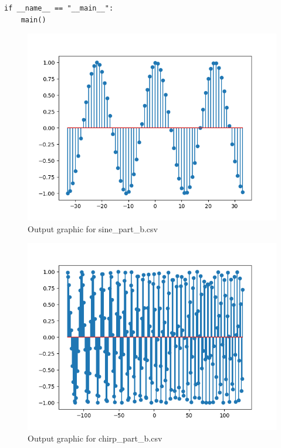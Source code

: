\documentclass[10pt,a4paper, margin=1in]{article}
\begin{document}
\begin{enumerate}
\begin{enumerate}
\begin{lstlisting}
if __name__ == "__main__":
    main()
                \end{lstlisting}
                    \begin{figure}[H]
                        \centering
                        \includegraphics[scale=0.75]{sine_part_b.png}
                        \caption{Output graphic for sine\_part\_b.csv}
                    \end{figure}
                    \begin{figure}[H]
                        \centering
                        \includegraphics[scale = 0.75]{chirp_part_b.png}
                        \caption{Output graphic for chirp\_part\_b.csv}
                    \end{figure}

\end{enumerate}
\end{enumerate}
\end{document}
